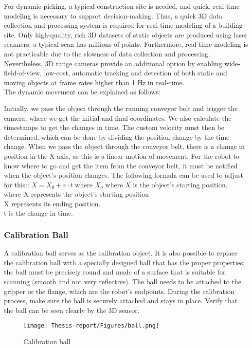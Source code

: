 \documentclass[12pt]{article}
\begin{document}
For dynamic picking, a typical construction site is needed, and quick, real-time modeling is necessary to support decision-making.  Thus, a quick 3D data collection and processing system is required for real-time modeling of a building site.  Only high-quality, rich 3D datasets of static objects are produced using laser scanners; a typical scan has millions of points.  Furthermore, real-time modeling is not practicable due to the slowness of data collection and processing.  Nevertheless, 3D range cameras provide an additional option by enabling wide-field-of-view, low-cost, automatic tracking and detection of both static and moving objects at frame rates higher than 1 Hz in real-time.\\

The dynamic movement can be explained as follows:

Initially, we pass the object through the running conveyor belt and trigger the camera, where we get the initial and final coordinates. We also calculate the timestamps to get the changes in time. The custom velocity must then be determined, which can be done by dividing the position change by the time change.
When we pass the object through the conveyor belt, there is a change in position in the X axis, as this is a linear motion of movement. For the robot to know where to go and get the item from the conveyor belt, it must be notified when the object's position changes.  The following formula can be used to adjust for this:: $X = X_0 + v\cdot t$ where $X_o$ where $X$ is the object's starting position.\\
where X represents the object's starting position\\
X represents its ending position.\\
t is the change in time. 


\subsubsection{Calibration Ball}
A calibration ball serves as the calibration object. It is also possible to replace the calibration ball with a specially designed ball that has the proper properties; the ball must be precisely round and made of a surface that is suitable for scanning (smooth and not very reflective). The ball needs to be attached to the gripper or the flange, which are the robot's endpoints. During the calibration process, make sure the ball is securely attached and stays in place. Verify that the ball can be seen clearly by the 3D sensor\cite{ref2}. \\
\begin{figure}[h]
    \centering
    \texttt{[image: Thesis-report/Figures/ball.png]}
    \caption{Calibration ball \cite{ref2}}
    \label{fig:Photoneo Cmaera}
\end{figure} 
\end{document}

